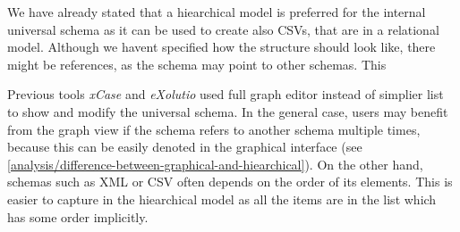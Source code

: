 


We have already stated that a hiearchical model is preferred for the internal universal schema as it can be used to create also CSVs, that are in a relational model. Although we havent specified how the structure should look like, there might be references, as the schema may point to other schemas. This

Previous tools \textit{xCase} and \textit{eXolutio} used full graph editor instead of simplier list to show and modify the universal schema. In the general case, users may benefit from the graph view if the schema refers to another schema multiple times, because this can be easily denoted in the graphical interface (see \autoref{analysis/difference-between-graphical-and-hiearchical}). On the other hand, schemas such as XML or CSV often depends on the order of its elements. This is easier to capture in the hiearchical model as all the items are in the list which has some order implicitly.

